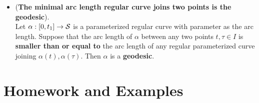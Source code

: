\documentclass[11pt]{article}
\begin{document}
\begin{itemize}
\item \begin{proposition}\label{prop: regular_minimal_arc}
(\textbf{The minimal arc length regular curve joins two points is the geodesic}).\\ 
Let $\alpha: [0,t_{1}]\rightarrow {\mathcal S}$ is a parameterized regular curve with parameter as the arc length. Suppose that the arc length of $\alpha$ between any two points $t, \tau \in I$ is \textbf{smaller than or equal to} the arc length of any regular parameterized curve joining $\alpha(t), \alpha(\tau)$. Then $\alpha$ is a \textbf{geodesic}. 
\end{proposition}
\end{itemize}

\newpage
\section{Homework and Examples}
\end{document}
